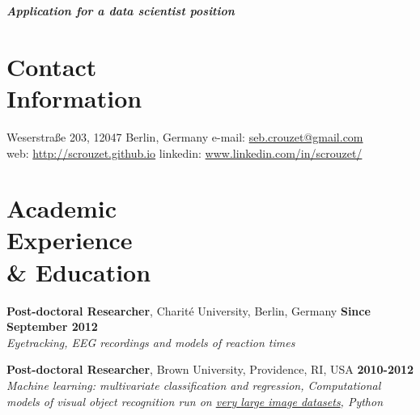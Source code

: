 \documentclass[margin,line]{resume}
\begin{document}
\begin{resume}

    \hfill \textbf{ \textsl{ \large Application for a data scientist position}}
    
    \vspace{3mm}
    \section{\mysidestyle Contact\\Information}
    Weserstraße 203, 12047 Berlin, Germany            \hfill e-mail: \href{mailto:seb.crouzet@gmail.com}{seb.crouzet@gmail.com} \\
    web: \url{http://scrouzet.github.io} \hfill linkedin: \url{www.linkedin.com/in/scrouzet/}

    \vspace{3mm}
    \section{\mysidestyle  Academic \\ Experience\\ \& Education  }
    
         \textbf{Post-doctoral Researcher}, Charité University, Berlin, Germany \hfill \textbf{Since September 2012}\\
	\textsl{Eyetracking, EEG recordings and models of reaction times}
  	
	\vspace{-1.5mm}		
	\textbf{Post-doctoral Researcher}, Brown University, Providence, RI, USA \hfill \textbf{2010-2012}\\
	\textsl{Machine learning: multivariate classification and regression, Computational models of visual object recognition run on \href{www.imagenet.org}{very large image datasets}, Python}


\end{resume}
\end{document}
